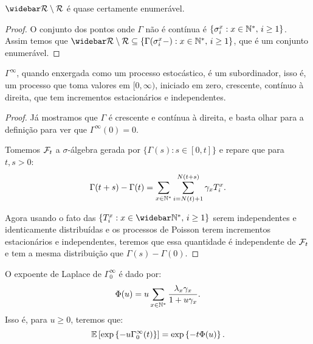 \begin{proposicao}
  $\RRb \setminus \RR$ é quase certamente enumerável.
\end{proposicao}
\begin{proof}
  O conjunto dos pontos onde $\Gamma$ não é contínua é $\{ \sigma_i^x:
  x \in {\mathbb{N^*}}, \, i \geq 1\}$. Assim temos que $\RRb \setminus \RR
  \subseteq \{ \Gamma(\sigma_i^x-): x \in \Nz, \, i \geq 1\}$, que é
  um conjunto enumerável.
\end{proof}

\begin{proposicao}
  $\Gamma^\infty$, quando enxergada como um processo estocástico, é
  um subordinador, isso é, um processo que toma valores em $[0,
  \infty)$, iniciado em zero, crescente, contínuo à direita, que tem
  incrementos estacionários e independentes.
\end{proposicao}
\begin{proof}

  Já mostramos que $\Gamma$ é crescente e contínua à direita, e basta
  olhar para a definição para ver que $\Gamma^\infty(0) = 0$.

  Tomemos ${\mathcal{F}}_t$ a $\sigma$-álgebra gerada por $\{ \Gamma(s): s \in [0,
  t]\}$ e repare que para $t, s > 0$:
  \begin{displaymath}
    \Gamma(t+s) - \Gamma(t) = \sum_{x \in {\mathbb{N^*}}} \sum_{i =
      N(t)+1}^{N(t+s)} \gamma_x T_i^x.
  \end{displaymath}

  Agora usando o fato das $\{ T_i^x: x \in \Nzb, \, i \geq 1\}$ serem
  independentes e identicamente distribuídas e os processos de Poisson
  terem incrementos estacionários e independentes, teremos que essa
  quantidade é independente de ${\mathcal{F}}_t$ e tem a mesma distribuição que
  $\Gamma(s) - \Gamma(0)$.
\end{proof}

\begin{proposicao}
  O expoente de Laplace de $\Gamma^\infty_0$ é dado por:
  \begin{displaymath}
    \Phi(u) = u \sum_{x \in {\mathbb{N^*}}} \frac{\lambda_x \gamma_x}{1 + u\gamma_x}.
  \end{displaymath}
  Isso é, para $u \geq 0$, teremos que:
  \begin{displaymath}
    {\mathbb{E}} \left[
      \exp \left\{
        -u \Gamma^\infty_0 (t)
      \right\}
    \right] = 
    \exp\left\{
      -t \Phi(u)
    \right\}.
  \end{displaymath}
\end{proposicao}


